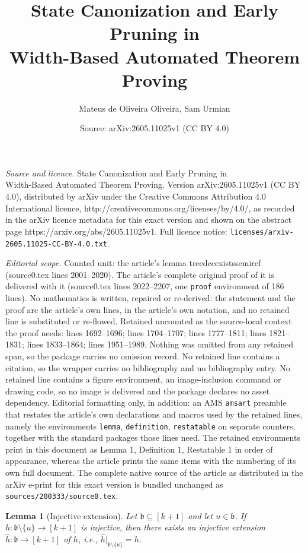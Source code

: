 \documentclass[10pt,a4paper]{amsart}
\title{State Canonization and Early Pruning in\\Width-Based Automated Theorem Proving}
\author{Mateus de Oliveira Oliveira, Sam Urmian}
\date{Source: arXiv:2605.11025v1 (CC BY 4.0)}
\newtheorem{lemma}{Lemma}
\newcommand{\abag}{\mathfrak{b}}
\newcommand{\treewidthvalue}{k}
\newcommand{\vertexone}{u}
\begin{document}
\maketitle

\noindent\emph{Source and licence.} State Canonization and Early Pruning in\\Width-Based Automated Theorem Proving. Version arXiv:2605.11025v1 (CC BY 4.0), distributed by arXiv under the Creative Commons Attribution 4.0 International licence, http://creativecommons.org/licenses/by/4.0/, as recorded in the arXiv licence metadata for this exact version and shown on the abstract page https://arxiv.org/abs/2605.11025v1. Full licence notice: \texttt{licenses/arxiv-2605.11025-CC-BY-4.0.txt}.\par\smallskip

\noindent\textit{Editorial scope.} Counted unit: the article's lemma treedecexistssemiref (source0.tex lines 2001--2020). The article's complete original proof of it is delivered with it (source0.tex lines 2022--2207, one \texttt{proof} environment of 186 lines). No mathematics is written, repaired or re-derived: the statement and the proof are the article's own lines, in the article's own notation, and no retained line is substituted or re-flowed.  Retained uncounted as the source-local context the proof needs: lines 1692--1696; lines 1704--1707; lines 1777--1811; lines 1821--1831; lines 1833--1864; lines 1951--1989.  Nothing was omitted from any retained span, so the package carries no omission record.  No retained line contains a citation, so the wrapper carries no bibliography and no bibliography entry.  No retained line contains a figure environment, an image-inclusion command or drawing code, so no image is delivered and the package declares no asset dependency.  Editorial formatting only, in addition: an AMS \texttt{amsart} preamble that restates the article's own declarations and macros used by the retained lines, namely the environments \texttt{lemma}, \texttt{definition}, \texttt{restatable} on separate counters, together with the standard packages those lines need.  The retained environments print in this document as Lemma 1, Definition 1, Restatable 1 in order of appearance, whereas the article prints the same items with the numbering of its own full document.  The complete native source of the article as distributed in the arXiv e-print for this exact version is bundled unchanged as \texttt{sources/200333/source0.tex}.
\begin{lemma}[Injective extension]
\label{lemma:injective-extension}
Let $\abag\subseteq [\treewidthvalue+1]$ and let $\vertexone\in \abag$.
If $h:\abag\setminus\{\vertexone\}\to [\treewidthvalue+1]$ is injective, then there exists an injective extension $\hat h:\abag\to[\treewidthvalue+1]$ of $h$, i.e., $\hat h|_{\abag\setminus\{\vertexone\}}=h$.
\end{lemma}
\end{document}
